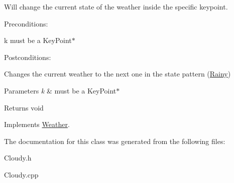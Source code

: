 Will change the current state of the weather inside the specific keypoint. 

Preconditions\+:
\begin{DoxyItemize}
\item k must be a Key\+Point$\ast$
\end{DoxyItemize}

Postconditions\+:
\begin{DoxyItemize}
\item Changes the current weather to the next one in the state pattern (\hyperlink{classRainy}{Rainy})
\end{DoxyItemize}


\begin{DoxyParams}{Parameters}
{\em k} & must be a Key\+Point$\ast$ \\
\hline
\end{DoxyParams}
\begin{DoxyReturn}{Returns}
void 
\end{DoxyReturn}


Implements \hyperlink{classWeather}{Weather}.



The documentation for this class was generated from the following files\+:\begin{DoxyCompactItemize}
\item 
Cloudy.\+h\item 
Cloudy.\+cpp\end{DoxyCompactItemize}
